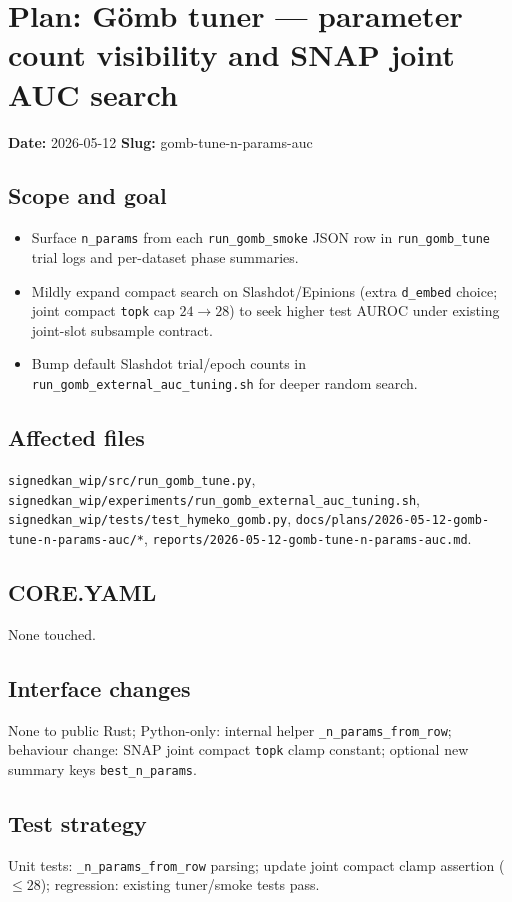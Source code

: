 \documentclass{article}
\begin{document}
\section*{Plan: Gömb tuner --- parameter count visibility and SNAP joint AUC search}

\textbf{Date:} 2026-05-12 \quad \textbf{Slug:} gomb-tune-n-params-auc

\subsection*{Scope and goal}
\begin{itemize}
  \item Surface \texttt{n\_params} from each \texttt{run\_gomb\_smoke} JSON row in
    \texttt{run\_gomb\_tune} trial logs and per-dataset phase summaries.
  \item Mildly expand compact search on Slashdot/Epinions (extra \texttt{d\_embed}
    choice; joint compact \texttt{topk} cap $24 \rightarrow 28$) to seek higher
    test AUROC under existing joint-slot subsample contract.
  \item Bump default Slashdot trial/epoch counts in
    \texttt{run\_gomb\_external\_auc\_tuning.sh} for deeper random search.
\end{itemize}

\subsection*{Affected files}
\texttt{signedkan\_wip/src/run\_gomb\_tune.py},
\texttt{signedkan\_wip/experiments/run\_gomb\_external\_auc\_tuning.sh},
\texttt{signedkan\_wip/tests/test\_hymeko\_gomb.py},
\texttt{docs/plans/2026-05-12-gomb-tune-n-params-auc/*},
\texttt{reports/2026-05-12-gomb-tune-n-params-auc.md}.

\subsection*{CORE.YAML}
None touched.

\subsection*{Interface changes}
None to public Rust; Python-only: internal helper
\texttt{\_n\_params\_from\_row}; behaviour change: SNAP joint compact
\texttt{topk} clamp constant; optional new summary keys \texttt{best\_n\_params}.

\subsection*{Test strategy}
Unit tests: \texttt{\_n\_params\_from\_row} parsing; update joint compact
clamp assertion ($\le 28$); regression: existing tuner/smoke tests pass.
\end{document}

